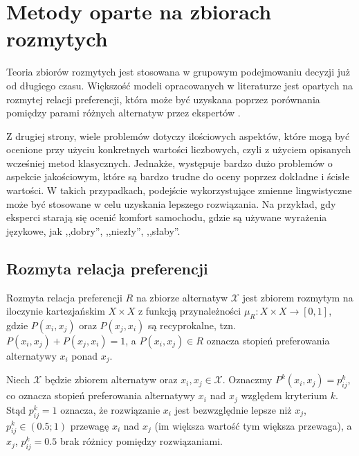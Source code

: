 \section{Metody oparte na zbiorach rozmytych}
Teoria zbiorów rozmytych jest stosowana w grupowym podejmowaniu decyzji już od 
długiego czasu. Większość modeli opracowanych w literaturze jest 
opartych na rozmytej relacji preferencji, która może być uzyskana poprzez 
porównania pomiędzy parami różnych alternatyw przez ekspertów
\cite{Xu2007,Xu2008,Chiclana1996,Peneva2008}.

Z drugiej strony, wiele problemów dotyczy ilościowych aspektów, które mogą być 
ocenione przy użyciu konkretnych wartości liczbowych, czyli z użyciem opisanych 
wcześniej metod klasycznych. Jednakże, występuje bardzo dużo problemów o 
aspekcie jakościowym, które są bardzo trudne do oceny poprzez dokładne i ścisłe 
wartości. W takich przypadkach, podejście wykorzystujące zmienne lingwistyczne 
może być stosowane w celu uzyskania lepszego rozwiązania. Na przykład, gdy 
eksperci starają się ocenić komfort samochodu, gdzie są używane wyrażenia 
językowe, jak ,,dobry'', ,,niezły'', ,,słaby''.

\subsection{Rozmyta relacja preferencji}

\begin{definition}
Rozmyta relacja preferencji $R$ na zbiorze alternatyw $\mathcal{X}$ jest zbiorem
rozmytym na iloczynie kartezjańskim $X \times X$ z funkcją przynależności
$\mu_R : X \times X \rightarrow [0,1]$, gdzie $P(x_i,x_j)$
oraz $P(x_j,x_i)$ są recyprokalne, tzn. $P(x_i,x_j) + P(x_j,x_i) = 1$, a
$P(x_i,x_j) \in R$ oznacza stopień preferowania alternatywy $x_i$ ponad $x_j$.
\end{definition}

Niech $\mathcal{X}$ będzie zbiorem alternatyw oraz $x_i,x_j \in \mathcal{X}$.
Oznaczmy $P^k(x_i,x_j) = p^k_{ij}$, co oznacza stopień preferowania alternatywy 
$x_i$ nad $x_j$ względem kryterium $k$. Stąd $p^k_{ij} = 1$ oznacza, że
rozwiązanie $x_i$ jest bezwzględnie lepsze niż $x_j$, $p^k_{ij} \in (0.5; 1)$
przewagę $x_i$ nad $x_j$ (im większa wartość tym większa przewaga), a $x_j$,
$p^k_{ij} = 0.5$ brak różnicy pomiędzy rozwiązaniami.

